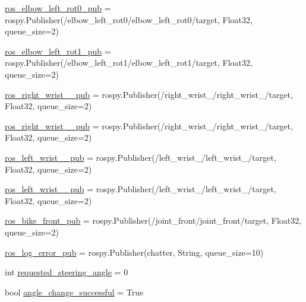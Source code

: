 \begin{DoxyCompactItemize}
\item 
\mbox{\hyperlink{namespacesteering__simulation_a3e18ade3c9e741db3cd48035d7d11b43}{ros\+\_\+elbow\+\_\+left\+\_\+rot0\+\_\+pub}} = rospy.\+Publisher(\textquotesingle{}/elbow\+\_\+left\+\_\+rot0/elbow\+\_\+left\+\_\+rot0/target\textquotesingle{}, Float32, queue\+\_\+size=2)
\item 
\mbox{\hyperlink{namespacesteering__simulation_a7cf7d50a6b2f01251abedd8a59233be3}{ros\+\_\+elbow\+\_\+left\+\_\+rot1\+\_\+pub}} = rospy.\+Publisher(\textquotesingle{}/elbow\+\_\+left\+\_\+rot1/elbow\+\_\+left\+\_\+rot1/target\textquotesingle{}, Float32, queue\+\_\+size=2)
\item 
\mbox{\hyperlink{namespacesteering__simulation_a8e0b19adafe885231a487bf8378b0fa3}{ros\+\_\+right\+\_\+wrist\+\_\+\_\+pub}} = rospy.\+Publisher(\textquotesingle{}/right\+\_\+wrist\+\_/right\+\_\+wrist\+\_/target\textquotesingle{}, Float32, queue\+\_\+size=2)
\item 
\mbox{\hyperlink{namespacesteering__simulation_a7650fabdc834af9527c1add7de4e3c7e}{ros\+\_\+right\+\_\+wrist\+\_\+\_\+pub}} = rospy.\+Publisher(\textquotesingle{}/right\+\_\+wrist\+\_/right\+\_\+wrist\+\_/target\textquotesingle{}, Float32, queue\+\_\+size=2)
\item 
\mbox{\hyperlink{namespacesteering__simulation_aae568c25dad5bee09d010a369a03d5c4}{ros\+\_\+left\+\_\+wrist\+\_\+\_\+pub}} = rospy.\+Publisher(\textquotesingle{}/left\+\_\+wrist\+\_/left\+\_\+wrist\+\_/target\textquotesingle{}, Float32, queue\+\_\+size=2)
\item 
\mbox{\hyperlink{namespacesteering__simulation_ab5f317214f6776ddc111dee9afe1f0c3}{ros\+\_\+left\+\_\+wrist\+\_\+\_\+pub}} = rospy.\+Publisher(\textquotesingle{}/left\+\_\+wrist\+\_/left\+\_\+wrist\+\_/target\textquotesingle{}, Float32, queue\+\_\+size=2)
\item 
\mbox{\hyperlink{namespacesteering__simulation_a2f98d3e960637df34f895f4ccee97bbe}{ros\+\_\+bike\+\_\+front\+\_\+pub}} = rospy.\+Publisher(\textquotesingle{}/joint\+\_\+front/joint\+\_\+front/target\textquotesingle{}, Float32, queue\+\_\+size=2)
\item 
\mbox{\hyperlink{namespacesteering__simulation_af24aa0340a9184e1a00a96bc8d68aef8}{ros\+\_\+log\+\_\+error\+\_\+pub}} = rospy.\+Publisher(\textquotesingle{}chatter\textquotesingle{}, String, queue\+\_\+size=10)
\item 
int \mbox{\hyperlink{namespacesteering__simulation_a1906425964226a8e34fc3f159b4d54fb}{requested\+\_\+steering\+\_\+angle}} = 0
\item 
bool \mbox{\hyperlink{namespacesteering__simulation_aa5275dfb8d3750aaec001938cd02a97d}{angle\+\_\+change\+\_\+successful}} = True
\end{DoxyCompactItemize}


